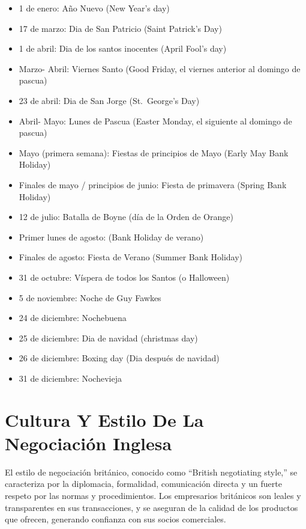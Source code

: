 \documentclass[letterpaper, 12pt]{article}
\begin{document}
\begin{itemize}[label=$\bullet$]
      \item 1 de enero: Año Nuevo (New Year's day)
      \item 17 de marzo: Dia de San Patricio (Saint Patrick's Day)
      \item 1 de abril: Dia de los santos inocentes (April Fool's day)
      \item Marzo- Abril: Viernes Santo (Good Friday, el viernes anterior al domingo de
            pascua)
      \item 23 de abril: Dia de San Jorge (St.~George's Day)
      \item Abril- Mayo: Lunes de Pascua (Easter Monday, el siguiente al domingo de pascua)
      \item Mayo (primera semana): Fiestas de principios de Mayo (Early May Bank Holiday)
      \item Finales de mayo / principios de junio: Fiesta de primavera (Spring Bank
            Holiday)
      \item 12 de julio: Batalla de Boyne (día de la Orden de Orange)
      \item Primer lunes de agosto: (Bank Holiday de verano)
      \item Finales de agosto: Fiesta de Verano (Summer Bank Holiday)
      \item 31 de octubre: Víspera de todos los Santos (o Halloween)
      \item 5 de noviembre: Noche de Guy Fawkes
      \item 24 de diciembre: Nochebuena
      \item 25 de diciembre: Dia de navidad (christmas day)
      \item 26 de diciembre: Boxing day (Dia después de navidad)
      \item 31 de diciembre: Nochevieja
\end{itemize}

\section*{Cultura Y Estilo De La Negociación Inglesa}

El estilo de negociación británico, conocido como “British negotiating style,”
se caracteriza por la diplomacia, formalidad, comunicación directa y un fuerte
respeto por las normas y procedimientos. Los empresarios británicos son leales
y transparentes en sus transacciones, y se aseguran de la calidad de los
productos que ofrecen, generando confianza con sus socios comerciales.
\end{document}
